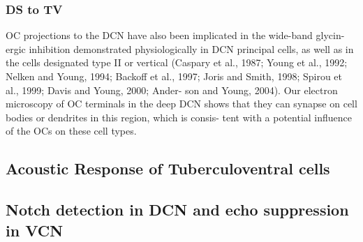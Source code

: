 

\subsubsection{DS to TV}
OC projections to the DCN have also been implicated in the wide-band glycin-
ergic inhibition demonstrated physiologically in DCN
principal cells, as well as in the cells designated type II or
vertical (Caspary et al., 1987; Young et al., 1992; Nelken
and Young, 1994; Backoff et al., 1997; Joris and Smith,
1998; Spirou et al., 1999; Davis and Young, 2000; Ander-
son and Young, 2004). Our electron microscopy of OC
terminals in the deep DCN shows that they can synapse
on cell bodies or dendrites in this region, which is consis-
tent with a potential inﬂuence of the OCs on these cell
types.


\subsection{Acoustic Response of Tuberculoventral cells}

\subsection{Notch detection in DCN and echo suppression in VCN}





